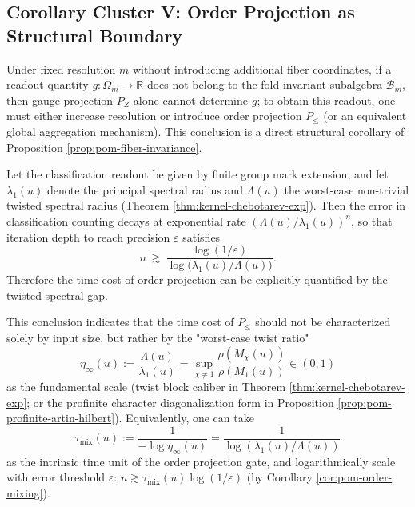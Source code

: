 \subsection{Corollary Cluster V: Order Projection as Structural Boundary}\label{subsec:pom-order-bottleneck}
\begin{corollary}\label{cor:pom-order-bottleneck}
Under fixed resolution $m$ without introducing additional fiber coordinates, if a readout quantity $g:\Omega_m\to\mathbb{R}$ does not belong to the fold-invariant subalgebra $\mathcal{B}_m$, then gauge projection $P_Z$ alone cannot determine $g$; to obtain this readout, one must either increase resolution or introduce order projection $P_{\le}$ (or an equivalent global aggregation mechanism). This conclusion is a direct structural corollary of Proposition \ref{prop:pom-fiber-invariance}.
\end{corollary}

\begin{corollary}\label{cor:pom-order-mixing}
Let the classification readout be given by finite group mark extension, and let $\lambda_1(u)$ denote the principal spectral radius and $\Lambda(u)$ the worst-case non-trivial twisted spectral radius (Theorem \ref{thm:kernel-chebotarev-exp}). Then the error in classification counting decays at exponential rate $(\Lambda(u)/\lambda_1(u))^n$, so that iteration depth to reach precision $\varepsilon$ satisfies
\[
n\ \gtrsim\ \frac{\log(1/\varepsilon)}{\log\!\bigl(\lambda_1(u)/\Lambda(u)\bigr)}.
\]
Therefore the time cost of order projection can be explicitly quantified by the twisted spectral gap.
\end{corollary}

\begin{remark}[Spectral Gauge Calibration of Order Projection (Spectral Gap = Ontological Time Scale)]\label{rem:pom-order-mixing-scale}
This conclusion indicates that the time cost of $P_{\le}$ should not be characterized solely by input size, but rather by the "worst-case twist ratio"
\[
\eta_\infty(u):=\frac{\Lambda(u)}{\lambda_1(u)}
=\sup_{\chi\neq 1}\frac{\rho(M_\chi(u))}{\rho(M_1(u))}
\in(0,1)
\]
as the fundamental scale (twist block caliber in Theorem \ref{thm:kernel-chebotarev-exp}; or the profinite character diagonalization form in Proposition \ref{prop:pom-profinite-artin-hilbert}).
Equivalently, one can take
\[
\tau_{\mathrm{mix}}(u):=\frac{1}{-\log \eta_\infty(u)}=\frac{1}{\log(\lambda_1(u)/\Lambda(u))}
\]
as the intrinsic time unit of the order projection gate, and logarithmically scale with error threshold $\varepsilon$:
\(
n\gtrsim \tau_{\mathrm{mix}}(u)\log(1/\varepsilon)
\)
(by Corollary \ref{cor:pom-order-mixing}).
\end{remark}

